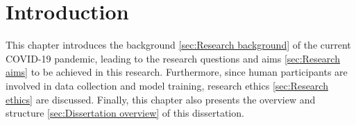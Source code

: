 \chapter{Introduction}
\label{chap:Introduction}
This chapter introduces the background \ref{sec:Research background} of the current COVID-19 pandemic, leading to the research questions and aims \ref{sec:Research aims} to be achieved in this research.
Furthermore, since human participants are involved in data collection and model training, research ethics \ref{sec:Research ethics} are discussed. Finally, this chapter also presents the overview and structure \ref{sec:Dissertation overview} of this dissertation.







